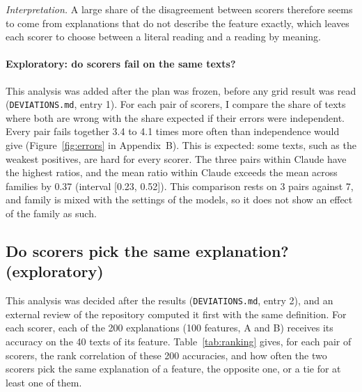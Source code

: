 \documentclass[11pt]{article}
\begin{document}
\textit{Interpretation.} A large share of the disagreement between scorers therefore seems to come from
explanations that do not describe the feature exactly, which leaves each scorer to
choose between a literal reading and a reading by meaning.

\paragraph{Exploratory: do scorers fail on the same texts?} This analysis was added
after the plan was frozen, before any grid result was read (\texttt{DEVIATIONS.md},
entry 1). For each pair of scorers, I compare the share of texts where both are wrong
with the share expected if their errors were independent. Every pair fails together
3.4 to 4.1 times more often than independence would give (Figure~\ref{fig:errors} in
Appendix~B). This is expected: some texts, such as the weakest positives, are hard for
every scorer. The three pairs within Claude have the highest ratios, and the mean
ratio within Claude exceeds the mean across families by 0.37 (interval [0.23, 0.52]).
This comparison rests on 3 pairs against 7, and family is mixed with the settings of
the models, so it does not show an effect of the family as such.

\subsection{Do scorers pick the same explanation? (exploratory)}

This analysis was decided after the results (\texttt{DEVIATIONS.md}, entry 2), and an
external review of the repository computed it first with the same definition. For each
scorer, each of the 200 explanations (100 features, A and B) receives its accuracy on
the 40 texts of its feature. Table~\ref{tab:ranking} gives, for each pair of scorers, the
rank correlation of these 200 accuracies, and how often the two scorers pick the same
explanation of a feature, the opposite one, or a tie for at least one of them.
\end{document}
